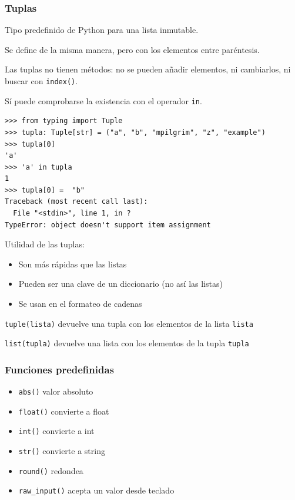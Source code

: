 \begin{frame}[fragile]
\frametitle{Tuplas}

Tipo predefinido de Python para una lista inmutable.

Se define de la misma manera, pero con los elementos entre paréntesis.

Las tuplas no tienen métodos: no se pueden añadir elementos, ni
cambiarlos, ni buscar con \verb|index()|.

Sí puede comprobarse la existencia con el operador \verb|in|.


\begin{footnotesize}
\begin{verbatim}
>>> from typing import Tuple
>>> tupla: Tuple[str] = ("a", "b", "mpilgrim", "z", "example") 
>>> tupla[0]                                       
'a'
>>> 'a' in tupla
1
>>> tupla[0] =  "b"
Traceback (most recent call last):
  File "<stdin>", line 1, in ?
TypeError: object doesn't support item assignment
\end{verbatim}
\end{footnotesize}

  
\end{frame}



\begin{frame}[fragile]

Utilidad de las tuplas:
\begin{itemize}
\item Son más rápidas que las listas
\item Pueden ser una clave de un diccionario (no así las listas)
\item Se usan en el formateo de cadenas
\end{itemize} 

\verb|tuple(lista)| devuelve una tupla con los elementos de la lista \verb|lista|

\verb|list(tupla)| devuelve una lista con los elementos de la tupla \verb|tupla|

\end{frame} 





\begin{frame}[fragile]
\frametitle{Funciones predefinidas}  
\begin{itemize}
  
\item 
\verb|abs()|   valor absoluto
\item 
\verb|float()|  convierte a float
\item 
\verb|int()|  convierte a int
\item 
\verb|str()|  convierte a string
\item 
\verb|round()|  redondea
\item 
\verb|raw_input()|  acepta un valor desde teclado


\end{itemize}
\end{frame}




